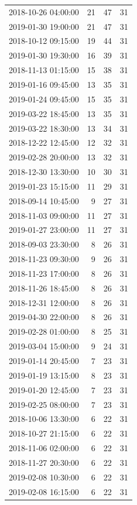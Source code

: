 \begin{tabular}{lrrr}
2018-10-26 04:00:00 & 21 & 47 & 31 \\
2019-01-30 19:00:00 & 21 & 47 & 31 \\
2018-10-12 09:15:00 & 19 & 44 & 31 \\
2019-01-30 19:30:00 & 16 & 39 & 31 \\
2018-11-13 01:15:00 & 15 & 38 & 31 \\
2019-01-16 09:45:00 & 13 & 35 & 31 \\
2019-01-24 09:45:00 & 15 & 35 & 31 \\
2019-03-22 18:45:00 & 13 & 35 & 31 \\
2019-03-22 18:30:00 & 13 & 34 & 31 \\
2018-12-22 12:45:00 & 12 & 32 & 31 \\
2019-02-28 20:00:00 & 13 & 32 & 31 \\
2018-12-30 13:30:00 & 10 & 30 & 31 \\
2019-01-23 15:15:00 & 11 & 29 & 31 \\
2018-09-14 10:45:00 & 9 & 27 & 31 \\
2018-11-03 09:00:00 & 11 & 27 & 31 \\
2019-01-27 23:00:00 & 11 & 27 & 31 \\
2018-09-03 23:30:00 & 8 & 26 & 31 \\
2018-11-23 09:30:00 & 9 & 26 & 31 \\
2018-11-23 17:00:00 & 8 & 26 & 31 \\
2018-11-26 18:45:00 & 8 & 26 & 31 \\
2018-12-31 12:00:00 & 8 & 26 & 31 \\
2019-04-30 22:00:00 & 8 & 26 & 31 \\
2019-02-28 01:00:00 & 8 & 25 & 31 \\
2019-03-04 15:00:00 & 9 & 24 & 31 \\
2019-01-14 20:45:00 & 7 & 23 & 31 \\
2019-01-19 13:15:00 & 8 & 23 & 31 \\
2019-01-20 12:45:00 & 7 & 23 & 31 \\
2019-02-25 08:00:00 & 7 & 23 & 31 \\
2018-10-06 13:30:00 & 6 & 22 & 31 \\
2018-10-27 21:15:00 & 6 & 22 & 31 \\
2018-11-06 02:00:00 & 6 & 22 & 31 \\
2018-11-27 20:30:00 & 6 & 22 & 31 \\
2019-02-08 10:30:00 & 6 & 22 & 31 \\
2019-02-08 16:15:00 & 6 & 22 & 31 \\

\end{tabular}
